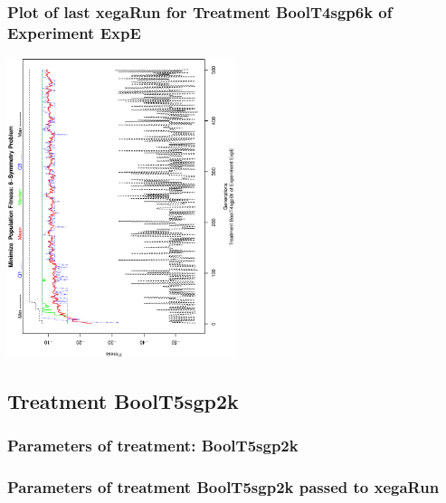 \documentclass[18pt,c]{beamer}
\makeatletter
\def\beamer@writeslidentry@miniframesoff{%
  \expandafter\beamer@ifempty\expandafter{\beamer@framestartpage}{}%
  {%
   \clearpage\beamer@notesactions%
  }
}
\newcommand*{\miniframesoff}{\let\beamer@writeslidentry=\beamer@writeslidentry@miniframesoff}
\makeatother
\begin{document}
 \begin{frame}
 \frametitle{ Plot of last xegaRun for Treatment BoolT4sgp6k of Experiment ExpE }
 \begin{center}
\includegraphics[width=0.5\textwidth, angle=-90]
{ExpEPlotPopStatsFigure004.eps}
 \end{center}
 \label{report/ExpEPlotPopStatsFigure004.eps}  
 \end{frame}

\miniframesoff
\subsection{Treatment BoolT5sgp2k}

 \begin{frame}
 \fontsize{8pt}{9pt}\selectfont
 \frametitle{  Parameters of treatment: BoolT5sgp2k 
 }

 \label{ExpEtParmTable020.tex}  
 \end{frame}


 \begin{frame}
 \fontsize{8pt}{9pt}\selectfont
 \frametitle{  Parameters of treatment BoolT5sgp2k passed to xegaRun
 }

 \label{ExpEtParmTable021.tex}  
 \end{frame}
\end{document}
